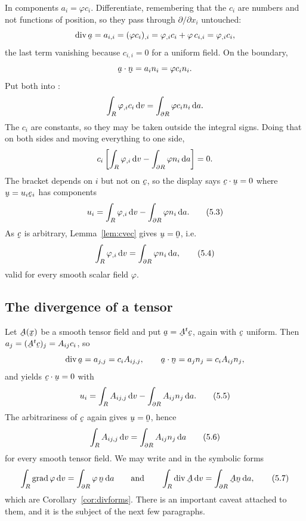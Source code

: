 In components $a_{i}=\varphi c_{i}$. Differentiate, remembering that the
$c_{i}$ are numbers and not functions of position, so they pass through
$\partial/\partial x_{i}$ untouched:
\[
   \dvg\ba=a_{i,i}=(\varphi c_{i})_{,i}=\varphi_{,i}c_{i}+\varphi\,c_{i,i}
   =\varphi_{,i}c_{i},
\]
the last term vanishing because $c_{i,i}=0$ for a uniform field. On the
boundary,
\[
   \ip\ba\bn=a_{i}n_{i}=\varphi c_{i}n_{i}.
\]
Put both into :
\[
   \int_{R}\varphi_{,i}c_{i}\,\mathrm{d} v=\int_{\partial R}\varphi c_{i}n_{i}\,\mathrm{d} a .
\]
The $c_{i}$ are constants, so they may be taken outside the integral
signs. Doing that on both sides and moving everything to one side,
\[
   c_{i}\left[\int_{R}\varphi_{,i}\,\mathrm{d} v
              -\int_{\partial R}\varphi n_{i}\,\mathrm{d} a\right]=0 .
\]
The bracket depends on $i$ but not on $\bc$, so the display says
$\ip\bc\bu=0$ where $\bu=u_{i}\be_{i}$ has components
\begin{equation}
   u_{i}=\int_{R}\varphi_{,i}\,\mathrm{d} v-\int_{\partial R}\varphi n_{i}\,\mathrm{d} a .
   \tag{5.3}\label{eq:5.3}
\end{equation}
As $\bc$ is arbitrary, Lemma~\ref{lem:cvec} gives $\bu=\bze$, i.e.
\begin{equation}
   \int_{R}\varphi_{,i}\,\mathrm{d} v=\int_{\partial R}\varphi n_{i}\,\mathrm{d} a ,
   \tag{5.4}\label{eq:5.4}
\end{equation}
valid for every smooth scalar field $\varphi$.

\subsection*{The divergence of a tensor}

Let $\bA(\bx)$ be a smooth tensor field and put $\ba=\bA^{t}\bc$, again
with $\bc$ uniform. Then $a_{j}=(\bA^{t}\bc)_{j}=A_{ij}c_{i}$, so
\[
   \dvg\ba=a_{j,j}=c_{i}A_{ij,j},
   \qquad
   \ip\ba\bn=a_{j}n_{j}=c_{i}A_{ij}n_{j},
\]
and  yields $\ip\bc\bu=0$ with
\begin{equation}
   u_{i}=\int_{R}A_{ij,j}\,\mathrm{d} v-\int_{\partial R}A_{ij}n_{j}\,\mathrm{d} a .
   \tag{5.5}\label{eq:5.5}
\end{equation}
The arbitrariness of $\bc$ again gives $\bu=\bze$, hence
\begin{equation}
   \int_{R}A_{ij,j}\,\mathrm{d} v=\int_{\partial R}A_{ij}n_{j}\,\mathrm{d} a
   \tag{5.6}\label{eq:5.6}
\end{equation}
for every smooth tensor field. We may write  and  in the
symbolic forms
\begin{equation}
   \int_{R}\grad\varphi\,\dl v=\int_{\partial R}\varphi\,\bn\,\dl a
   \qquad\text{and}\qquad
   \int_{R}\dvg\bA\,\dl v=\int_{\partial R}\bA\bn\,\dl a ,
   \tag{5.7}\label{eq:5.7}
\end{equation}
which are Corollary~\ref{cor:divforms}. There is an important caveat
attached to them, and it is the subject of the next few paragraphs.

